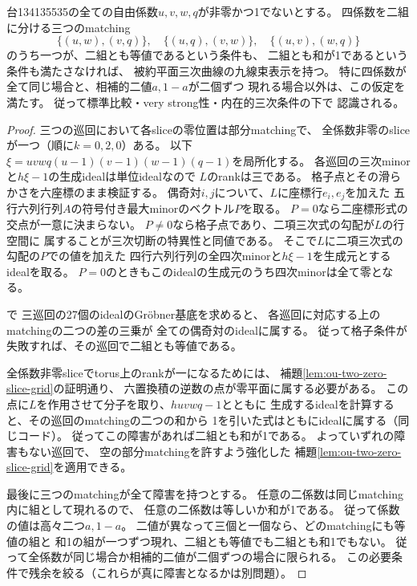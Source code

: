 \begin{proposition}[134135535の混合sliceに対する認識範囲]
\label{prop:ou-four-zero-mixed-grid}
台134135535の全ての自由係数$u,v,w,q$が非零かつ1でないとする。
四係数を二組に分ける三つのmatching
\[
 \{(u,w),(v,q)\},\quad
 \{(u,q),(v,w)\},\quad
 \{(u,v),(w,q)\}
\]
のうち一つが、二組とも等値であるという条件も、
二組とも和が1であるという条件も満たさなければ、
被約平面三次曲線の九線束表示を持つ。
特に四係数が全て同じ場合と、相補的二値$a,1-a$が二個ずつ
現れる場合以外は、この仮定を満たす。
従って標準比較・very strong性・内在的三次条件の下で
認識される。
\end{proposition}
\begin{proof}
三つの巡回において各sliceの零位置は部分matchingで、
全係数非零のsliceが一つ（順に$k=0,2,0$）ある。
以下$\xi=uvwq(u-1)(v-1)(w-1)(q-1)$を局所化する。
各巡回の三次minorと$h\xi-1$の生成idealは単位idealなので
$L$のrankは三である。
格子点とその滑らかさを六座標のまま検証する。
偶奇対$i,j$について、$L$に座標行$e_i,e_j$を加えた
五行六列行列$A$の符号付き最大minorのベクトル$P$を取る。
$P=0$なら二座標形式の交点が一意に決まらない。
$P\ne0$なら格子点であり、二項三次式の勾配が$L$の行空間に
属することが三次切断の特異性と同値である。
そこで$L$に二項三次式の勾配の$P$での値を加えた
四行六列行列の全四次minorと$h\xi-1$を生成元とするidealを取る。
$P=0$のときもこのidealの生成元のうち四次minorは全て零となる。

で
三巡回の27個のidealのGröbner基底を求めると、
各巡回に対応する上のmatchingの二つの差の三乗が
全ての偶奇対のidealに属する。
従って格子条件が失敗すれば、その巡回で二組とも等値である。

全係数非零sliceでtorus上のrankが一になるためには、
補題\ref{lem:ou-two-zero-slice-grid}の証明通り、
六置換積の逆数の点が零平面に属する必要がある。
この点に$L$を作用させて分子を取り、$huvwq-1$とともに
生成するidealを計算すると、その巡回のmatchingの二つの和から
1を引いた式はともにidealに属する（同じコード）。
従ってこの障害があれば二組とも和が1である。
よっていずれの障害もない巡回で、
空の部分matchingを許すよう強化した
補題\ref{lem:ou-two-zero-slice-grid}を適用できる。

最後に三つのmatchingが全て障害を持つとする。
任意の二係数は同じmatching内に組として現れるので、
任意の二係数は等しいか和が1である。
従って係数の値は高々二つ$a,1-a$。
二値が異なって三個と一個なら、どのmatchingにも等値の組と
和1の組が一つずつ現れ、二組とも等値でも二組とも和1でもない。
従って全係数が同じ場合か相補的二値が二個ずつの場合に限られる。
この必要条件で残余を絞る（これらが真に障害となるかは別問題）。
\end{proof}

